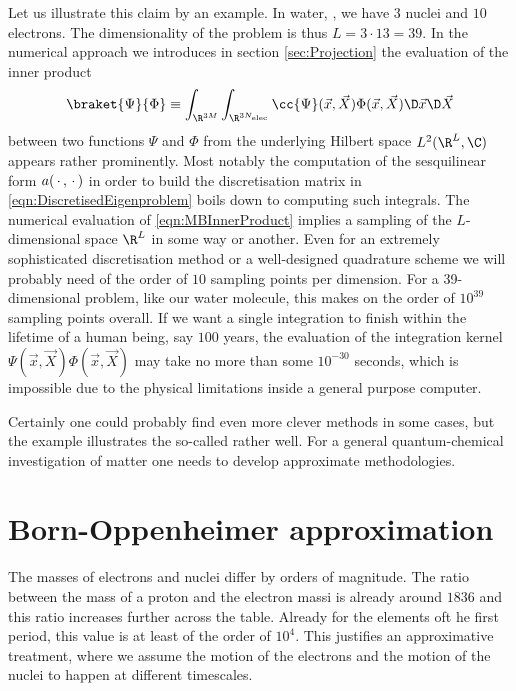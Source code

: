 Let us illustrate this claim by an example.
In water, , we have $3$ nuclei and $10$ electrons.
The dimensionality of the problem is thus $L = 3 \cdot 13 = 39$.
In the numerical approach we introduces in section \vref{sec:Projection}
the evaluation of the inner product
\begin{equation}
	\braket{\Psi}{\Phi} \equiv \int_{\R^{3M}} \int_{\R^{3\Nelec}}
		\cc{\Psi}(\vec{x}, \vec{X}) \Phi(\vec{x}, \vec{X})
	\D \vec{x} \D \vec{X}
	\label{eqn:MBInnerProduct}
\end{equation}
between two functions $\Psi$ and $\Phi$ from the
underlying Hilbert space $L^2(\R^L, \C)$ appears rather prominently.
Most notably the computation of the sesquilinear form $a(\,\cdot\,,\,\cdot\,)$
in order to build the discretisation matrix in \eqref{eqn:DiscretisedEigenproblem}
boils down to computing such integrals.
The numerical evaluation of \eqref{eqn:MBInnerProduct}
implies a sampling of the $L$-dimensional space $\R^L$ in some way or another.
Even for an extremely sophisticated discretisation method
or a well-designed quadrature scheme we will probably need of the order of
$10$ sampling points per dimension.
For a 39-dimensional problem, like our water molecule,
this makes on the order of $10^{39}$ sampling points overall.
If we want a single integration to finish within the lifetime of a human being,
say $100$ years,
the evaluation of the
integration kernel $\Psi(\vec{x}, \vec{X}) \Phi(\vec{x}, \vec{X})$
may take no more than some $10^{-30}$ seconds,
which is impossible due to the physical limitations inside a general purpose computer.

Certainly one could probably find even more clever methods in some cases,
but the example illustrates the so-called  rather well.
For a general quantum-chemical investigation of matter
one needs to develop approximate methodologies.

\section{Born-Oppenheimer approximation}
\label{sec:BO}
The masses of electrons and nuclei differ by orders of magnitude.
The ratio between the mass of a proton and the electron massi
is already around $1836$ and this ratio increases
further across the table.
Already for the elements oft he first period,
this value is at least of the order of $10^4$.
This justifies an approximative treatment,
where we assume the motion of the electrons
and the motion of the nuclei to happen at different timescales.

